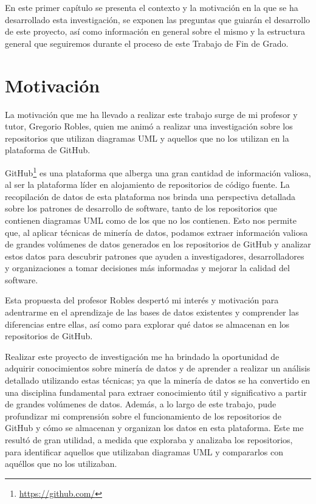 \documentclass[a4paper, 12pt]{book}
\begin{document}
En este primer capítulo se presenta el contexto y la motivación en la que se ha desarrollado esta investigación, se exponen las preguntas que guiarán el desarrollo de este proyecto, así como información en general sobre el mismo y la estructura general que seguiremos durante el proceso de este Trabajo de Fin de Grado.


\section{Motivación} %
\label{sec:motivación} %

La motivación que me ha llevado a realizar este trabajo surge de mi profesor y tutor, Gregorio Robles, quien me animó a realizar una investigación sobre los repositorios que utilizan diagramas UML y aquellos que no los utilizan en la plataforma de GitHub.


GitHub\footnote{\url{https://github.com/}} es una plataforma que alberga una gran cantidad de información valiosa, al ser la plataforma líder en alojamiento de repositorios de código fuente. 
La recopilación de datos de esta plataforma nos brinda una perspectiva detallada sobre los patrones de desarrollo de software, tanto de los repositorios que contienen diagramas UML como de los que no los contienen.
Esto nos permite que, al aplicar técnicas de minería de datos, podamos extraer información valiosa de grandes volúmenes de datos generados en los repositorios de GitHub y analizar estos datos para descubrir patrones que ayuden a investigadores, desarrolladores y organizaciones a tomar decisiones más informadas y mejorar la calidad del software.


Esta propuesta del profesor Robles despertó mi interés y motivación para adentrarme en el aprendizaje de las bases de datos existentes y comprender las diferencias entre ellas, así como para explorar qué datos se almacenan en los repositorios de GitHub.


Realizar este proyecto de investigación me ha brindado la oportunidad de adquirir conocimientos sobre minería de datos y de aprender a realizar un análisis detallado utilizando estas técnicas; ya que la minería de datos se ha convertido en una disciplina fundamental para extraer conocimiento útil y significativo a partir de grandes volúmenes de datos.
Además, a lo largo de este trabajo, pude profundizar mi comprensión sobre el funcionamiento de los repositorios de GitHub y cómo se almacenan y organizan los datos en esta plataforma. 
Este me resultó de gran utilidad, a medida que exploraba y analizaba los repositorios, para identificar aquellos que utilizaban diagramas UML y compararlos con aquéllos que no los utilizaban.
\end{document}
